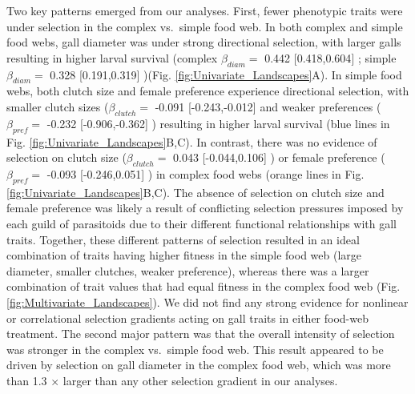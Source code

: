 \documentclass[]{elsarticle} %
\begin{document}
Two key patterns emerged from our analyses. First, fewer phenotypic
traits were under selection in the complex vs.~simple food web. In both
complex and simple food webs, gall diameter was under strong directional
selection, with larger galls resulting in higher larval survival
(complex \(\beta_{diam}=\) 0.442 {[}0.418,0.604{]} ; simple
\(\beta_{diam}=\) 0.328 {[}0.191,0.319{]} )(Fig.
\ref{fig:Univariate_Landscapes}A). In simple food webs, both clutch size
and female preference experience directional selection, with smaller
clutch sizes (\(\beta_{clutch}=\) -0.091 {[}-0.243,-0.012{]} and weaker
preferences (\(\beta_{pref}=\) -0.232 {[}-0.906,-0.362{]} ) resulting in
higher larval survival (blue lines in Fig.
\ref{fig:Univariate_Landscapes}B,C). In contrast, there was no evidence
of selection on clutch size (\(\beta_{clutch}=\) 0.043
{[}-0.044,0.106{]} ) or female preference (\(\beta_{pref}=\) -0.093
{[}-0.246,0.051{]} ) in complex food webs (orange lines in Fig.
\ref{fig:Univariate_Landscapes}B,C). The absence of selection on clutch
size and female preference was likely a result of conflicting selection
pressures imposed by each guild of parasitoids due to their different
functional relationships with gall traits. Together, these different
patterns of selection resulted in an ideal combination of traits having
higher fitness in the simple food web (large diameter, smaller clutches,
weaker preference), whereas there was a larger combination of trait
values that had equal fitness in the complex food web (Fig.
\ref{fig:Multivariate_Landscapes}). We did not find any strong evidence
for nonlinear or correlational selection gradients acting on gall traits
in either food-web treatment. The second major pattern was that the
overall intensity of selection was stronger in the complex vs.~simple
food web. This result appeared to be driven by selection on gall
diameter in the complex food web, which was more than 1.3 \(\times\)
larger than any other selection gradient in our analyses.
\end{document}
